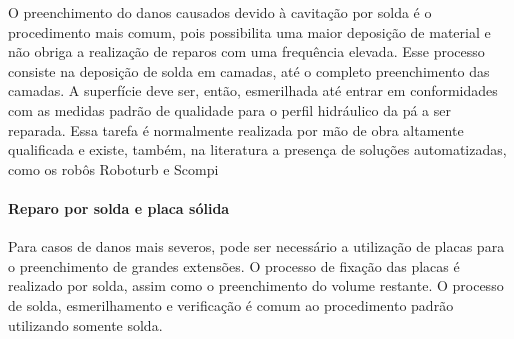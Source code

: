 O preenchimento do danos causados devido à cavitação por solda é o procedimento
mais comum, pois possibilita uma maior deposição de material e não obriga a
realização de reparos com uma frequência elevada. Esse processo consiste na
deposição de solda em camadas, até o completo preenchimento das camadas. A
superfície deve ser, então, esmerilhada até entrar em conformidades com as
medidas padrão de qualidade para o perfil hidráulico da pá a ser reparada. Essa tarefa
é normalmente realizada por mão de obra altamente qualificada e existe, também,
na literatura a presença de soluções automatizadas, como os robôs Roboturb e Scompi
\citep{roboturb,scompi}

\paragraph{Reparo por solda e placa sólida}

Para casos de danos mais severos, pode ser necessário a utilização de placas
para o preenchimento de grandes extensões. O processo de fixação das placas é
realizado por solda, assim como o preenchimento do volume restante. O processo
de solda, esmerilhamento e verificação é comum ao procedimento padrão utilizando
somente solda.













